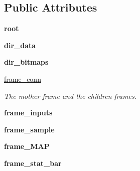 \subsection*{Public Attributes}
\begin{DoxyCompactItemize}
\item 
\mbox{\label{classasamba_1_1frontend__orig_1_1_g_u_i_ab02ff442958e60c1104128219993990e}} 
{\bfseries root}
\item 
\mbox{\label{classasamba_1_1frontend__orig_1_1_g_u_i_a0b733e9eedca186730369f6bc85cd07b}} 
{\bfseries dir\+\_\+data}
\item 
\mbox{\label{classasamba_1_1frontend__orig_1_1_g_u_i_a16f3d14bb673617bee56685f37bb90a0}} 
{\bfseries dir\+\_\+bitmaps}
\item 
\mbox{\label{classasamba_1_1frontend__orig_1_1_g_u_i_ab07d2cf890bce116c355b695ef3d69ee}} 
\hyperlink{classasamba_1_1frontend__orig_1_1_g_u_i_ab07d2cf890bce116c355b695ef3d69ee}{frame\+\_\+conn}
\begin{DoxyCompactList}\small\item\em The mother frame and the children frames. \end{DoxyCompactList}\item 
\mbox{\label{classasamba_1_1frontend__orig_1_1_g_u_i_aef02d079544f8eba516d753fa10f7252}} 
{\bfseries frame\+\_\+inputs}
\item 
\mbox{\label{classasamba_1_1frontend__orig_1_1_g_u_i_a2215ed4456c55772765539da0ce4284f}} 
{\bfseries frame\+\_\+sample}
\item 
\mbox{\label{classasamba_1_1frontend__orig_1_1_g_u_i_a2ffe91fef818d2e79621233b43e58973}} 
{\bfseries frame\+\_\+\+M\+AP}
\item 
\mbox{\label{classasamba_1_1frontend__orig_1_1_g_u_i_acd0b7f9e5c6ee7a96370ba1ac32b42cb}} 
{\bfseries frame\+\_\+stat\+\_\+bar}
\item 

\end{DoxyCompactItemize}
